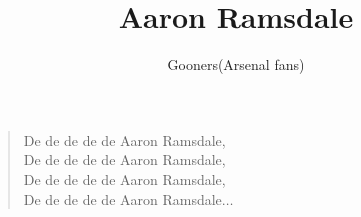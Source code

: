\documentclass[a4paper,12pt]{article}
\title{Aaron Ramsdale}
\author{Gooners(Arsenal fans)}
\date{}
\begin{document}
	
	\maketitle
	
	\begin{verse}
		
		De de de de de Aaron Ramsdale, \\
		De de de de de Aaron Ramsdale, \\
		De de de de de Aaron Ramsdale, \\
		De de de de de Aaron Ramsdale$\ldots$
		
	\end{verse}
	
\end{document}

